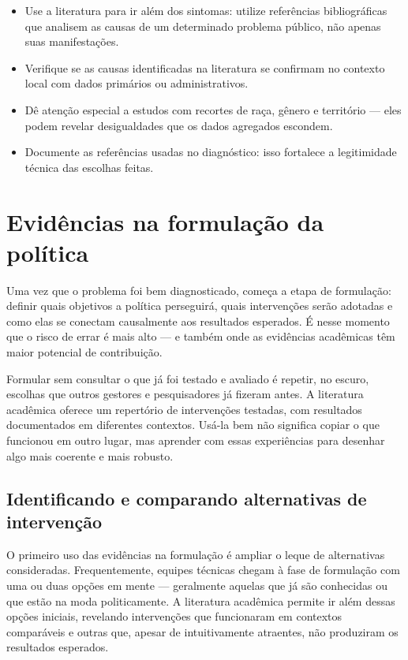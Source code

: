 \documentclass[12pt, a4paper, openany]{book}
\begin{document}
\begin{notabox}
\begin{itemize}[leftmargin=*]
  \item Use a literatura para ir além dos sintomas: utilize referências
    bibliográficas que analisem as causas de um determinado problema
    público, não apenas suas manifestações.
  \item Verifique se as causas identificadas na literatura se confirmam no
    contexto local com dados primários ou administrativos.
  \item Dê atenção especial a estudos com recortes de raça, gênero e
    território --- eles podem revelar desigualdades que os dados agregados
    escondem.
  \item Documente as referências usadas no diagnóstico: isso fortalece a
    legitimidade técnica das escolhas feitas.
\end{itemize}
\end{notabox}

\chapter{Evidências na formulação da política}\label{cap4}

Uma vez que o problema foi bem diagnosticado, começa a etapa de formulação:
definir quais objetivos a política perseguirá, quais intervenções serão
adotadas e como elas se conectam causalmente aos resultados esperados. É nesse
momento que o risco de errar é mais alto --- e também onde as evidências
acadêmicas têm maior potencial de contribuição.

Formular sem consultar o que já foi testado e avaliado é repetir, no escuro, escolhas que outros gestores e pesquisadores já fizeram antes. A literatura acadêmica oferece um repertório de intervenções testadas, com resultados documentados em diferentes contextos. Usá-la bem não significa copiar o que funcionou em outro lugar, mas aprender com essas experiências para desenhar algo mais coerente e mais robusto.

\section{Identificando e comparando alternativas de intervenção}

O primeiro uso das evidências na formulação é ampliar o leque de alternativas
consideradas. Frequentemente, equipes técnicas chegam à fase de formulação com
uma ou duas opções em mente --- geralmente aquelas que já são conhecidas ou
que estão na moda politicamente. A literatura acadêmica permite ir além
dessas opções iniciais, revelando intervenções que funcionaram em contextos
comparáveis e outras que, apesar de intuitivamente atraentes, não produziram
os resultados esperados.
\end{document}
